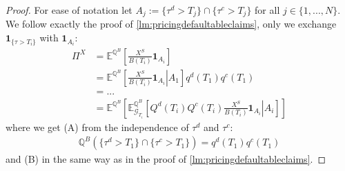 \documentclass[12pt]{article}
\begin{document}
	\begin{proof}
		For ease of notation let $A_j := \{\tau^d > T_j\} \cap\{\tau^c > T_j\}$ for all $j \in \{1, ..., N\}$.
		We follow exactly the proof of \cref{lm:pricingdefaultableclaims}, only we exchange $\mathbf{1}_{\{\tau > T_i\}}$ with $\mathbf{1}_{A_i}$:
		\begin{align*}
			\Pi^X &=  \mathbb{E}^{\mathbb{Q}^B}\left[\frac{X^S}{B(T_i)} \mathbf{1}_{A_i} \right]\\
			&=
			\mathbb{E}^{\mathbb{Q}^B}\left[\left.\frac{X^S}{B(T_i)} \mathbf{1}_{A_i} \right| A_1 \right]q^d(T_1)q^c(T_1)\tag{A}\\
			&=...\\
			&= \mathbb{E}^{\mathbb{Q}^B}\left[\mathbb{E}^{\mathbb{Q}^B}_{\mathcal{G}_{T_i}}\left[\left.Q^d(T_i)Q^c(T_i)\frac{X^S}{B(T_i)} \mathbf{1}_{A_i} \right| A_i \right]\right]\tag{B}
		\end{align*}
		where we get (A) from the independence of $\tau^d$ and $\tau^c$:
		\begin{align*}
			\mathbb{Q}^B\left(\{\tau^d > T_1\} \cap\{\tau^c > T_1\}\right) = q^d(T_1)q^c(T_1)
		\end{align*}
		and (B) in the same way as in the proof of \cref{lm:pricingdefaultableclaims}.
	\end{proof}
	
\end{document}
